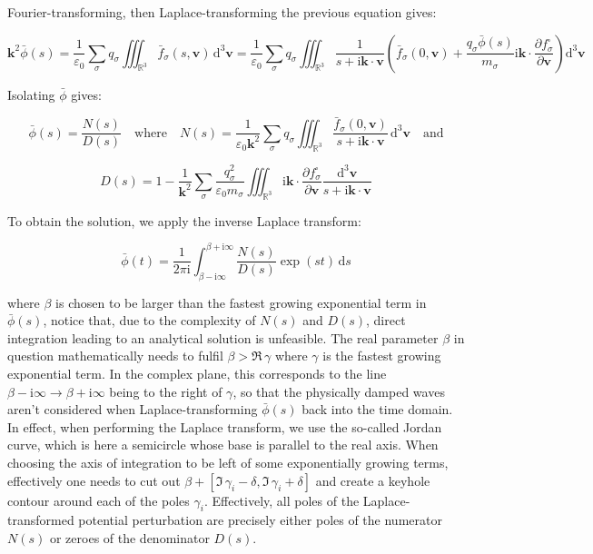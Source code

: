 Fourier-transforming, then Laplace-transforming the previous equation gives:

\begin{equation}
    \mathbf{k}^2\bar{\phi}(s)=\frac{1}{\varepsilon_0}\sum_{\sigma}q_\sigma\iiint_{\mathbb{R}^3}\bar{f}_\sigma(s,\mathbf{v})\,\mathrm{d}^3\mathbf{v}=\frac{1}{\varepsilon_0}\sum_\sigma q_\sigma\iiint_{\mathbb{R}^3}\frac{1}{s+\mathrm{i}\mathbf{k}\cdot\mathbf{v}}\left(\bar{f}_\sigma(0,\mathbf{v})+\frac{q_\sigma\bar{\phi}(s)}{m_\sigma}\mathrm{i}\mathbf{k}\cdot\frac{\partial f_\sigma^\square}{\partial\mathbf{v}}\right)\mathrm{d}^3\mathbf{v}
\end{equation}

Isolating $\bar{\phi}$ gives:

\begin{equation}
    \bar{\phi}(s)=\frac{N(s)}{D(s)}\quad\text{where}\quad N(s)=\frac{1}{\varepsilon_0\mathbf{k}^2}\sum_\sigma q_\sigma\iiint_{\mathbb{R}^3}\frac{\bar{f}_\sigma(0,\mathbf{v})}{s+\mathrm{i}\mathbf{k}\cdot\mathbf{v}}\,\mathrm{d}^3\mathbf{v}\quad\text{and}
\end{equation}

\begin{equation}
    D(s)=1-\frac{1}{\mathbf{k}^2}\sum_\sigma\frac{q_\sigma^2}{\varepsilon_0m_\sigma}\iiint_{\mathbb{R}^3}\mathrm{i}\mathbf{k}\cdot\frac{\partial f_\sigma^\square}{\partial\mathbf{v}}\frac{\mathrm{d}^3\mathbf{v}}{s+\mathrm{i}\mathbf{k}\cdot\mathbf{v}}
\end{equation}

To obtain the solution, we apply the inverse Laplace transform:

\begin{equation}
    \bar{\phi}(t)=\frac{1}{2\pi\mathrm{i}}\int_{\beta-\mathrm{i}\infty}^{\beta+\mathrm{i}\infty}\frac{N(s)}{D(s)}\exp{(st)}\,\mathrm{d}s
\end{equation}

where $\beta$ is chosen to be larger than the fastest growing exponential term in $\bar{\phi}(s)$, notice that, due to the complexity of $N(s)$ and $D(s)$, direct integration leading to an analytical solution is unfeasible. The real parameter $\beta$ in question mathematically needs to fulfil $\beta>\Re\,\gamma$ where $\gamma$ is the fastest growing exponential term. In the complex plane, this corresponds to the line $\beta-\mathrm{i}\infty\to\beta+\mathrm{i}\infty$ being to the right of $\gamma$, so that the physically damped waves aren't considered when Laplace-transforming $\bar{\phi}(s)$ back into the time domain. In effect, when performing the Laplace transform, we use the so-called Jordan curve, which is here a semicircle whose base is parallel to the real axis. When choosing the axis of integration to be left of some exponentially growing terms, effectively one needs to cut out $\beta+[\Im\,\gamma_i-\delta, \Im\,\gamma_i+\delta]$ and create a keyhole contour around each of the poles $\gamma_i$. Effectively, all poles of the Laplace-transformed potential perturbation are precisely either poles of the numerator $N(s)$ or zeroes of the denominator $D(s)$.

